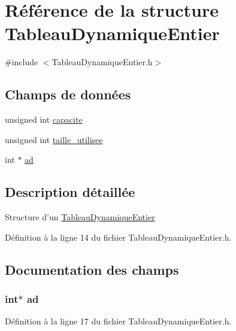 \hypertarget{struct_tableau_dynamique_entier}{\section{Référence de la structure Tableau\-Dynamique\-Entier}
\label{struct_tableau_dynamique_entier}
}


{\ttfamily \#include $<$Tableau\-Dynamique\-Entier.\-h$>$}

\subsection*{Champs de données}
\begin{DoxyCompactItemize}
\item 
unsigned int \hyperlink{struct_tableau_dynamique_entier_ac3e3c7196292bbc416a904d29ee638c8}{capacite}
\item 
unsigned int \hyperlink{struct_tableau_dynamique_entier_aaf681889cbd00b7c45951f63b10f969a}{taille\-\_\-utilisee}
\item 
int $\ast$ \hyperlink{struct_tableau_dynamique_entier_a7c21ee6003331d0316829f52011252d4}{ad}
\end{DoxyCompactItemize}


\subsection{Description détaillée}
Structure d'un \hyperlink{struct_tableau_dynamique_entier}{Tableau\-Dynamique\-Entier} 

Définition à la ligne 14 du fichier Tableau\-Dynamique\-Entier.\-h.



\subsection{Documentation des champs}
\hypertarget{struct_tableau_dynamique_entier_a7c21ee6003331d0316829f52011252d4}{
\subsubsection[{ad}]{\setlength{\rightskip}{0pt plus 5cm}int$\ast$ ad}}\label{struct_tableau_dynamique_entier_a7c21ee6003331d0316829f52011252d4}


Définition à la ligne 17 du fichier Tableau\-Dynamique\-Entier.\-h.

